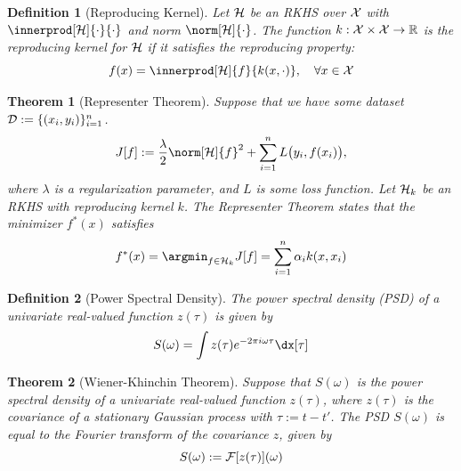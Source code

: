 \documentclass[10pt]{article}
\newtheorem{theorem}{Theorem}[section]
\newtheorem{definition}{Definition}[section]
\numberwithin{equation}{section}
\begin{document}
\begin{definition}[Reproducing Kernel]
\label{def:reproducing-kernel}
    Let $\mathcal{H}$ be an RKHS over $\mathcal{X}$ with $\innerprod[\calH]{\cdot}{\cdot}$ and norm $\norm[\calH]{\cdot}$. The function $k: \mathcal{X} \times \mathcal{X} \to \mathbb{R}$ is the reproducing kernel for $\mathcal{H}$ if it satisfies the reproducing property:
    \begin{equation}
        f(x) = \innerprod[\calH]{f}{k(x, \cdot)}, \quad \forall x \in \calX
    \end{equation}
\end{definition}

\begin{theorem}[Representer Theorem]
\label{thm:representer-theorem}
    Suppose that we have some dataset $\mathcal{D} := \{(x_{i}, y_{i})\}_{i=1}^{n}$.
    \begin{equation}
        J[f] := \frac{\lambda}{2}\norm[\calH]{f}^{2} + \sum_{i=1}^{n}L\big(y_{i}, f(x_{i})\big),
    \end{equation}
    where $\lambda$ is a regularization parameter, and $L$ is some loss function. Let $\mathcal{H}_{k}$ be an RKHS with reproducing kernel $k$. The Representer Theorem states that the minimizer $f^{*}(x)$ satisfies
    \begin{equation}
        f^{*}(x) = \argmin_{f \in \calH_{k}}J[f] = \sum_{i=1}^{n}\alpha_{i}k(x, x_{i})
    \end{equation}
\end{theorem}

\begin{definition}[Power Spectral Density]
\label{def:power-spectrum}
    The power spectral density (PSD) of a univariate real-valued function $z(\tau)$ is given by
    \begin{equation}
    \label{eq:PSD-definition}
        S(\omega) = \int z(\tau)e^{-2\pi{i}\omega\tau}\dx[\tau]
    \end{equation}
\end{definition}

\begin{theorem}[Wiener-Khinchin Theorem]
\label{thm:wiener-khinchin}
    Suppose that $S(\omega)$ is the power spectral density of a univariate real-valued function $z(\tau)$, where $z(\tau)$ is the covariance of a stationary Gaussian process with $\tau := t - t'$. The PSD $S(\omega)$ is equal to the Fourier transform of the covariance $z$, given by 
    \begin{equation}
        S(\omega) := \mathcal{F}[z(\tau)](\omega)
    \end{equation}
\end{theorem}
\end{document}
